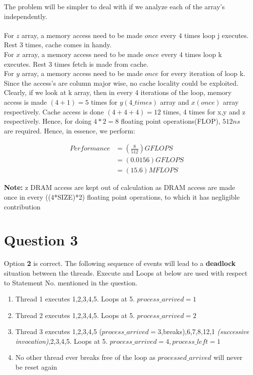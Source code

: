 \documentclass{article}
\newcommand{\bld}[1]{\textbf{#1}}
\newcommand{\ital}[1]{\textit{#1}}
\begin{document}
The problem will be simpler to deal with if we analyze each of the array's independently.\\\\
For $z$ array, a memory access need to be made $once$ every $4$ times loop j executes. Rest 3 times, cache comes in handy.\\
For $x$ array, a memory access need to be made $once$ every $4$ times loop k executes. Rest 3 times fetch is made from cache.\\
For $y$ array, a memory access need to be made $once$ for every iteration of loop k. Since the access's are column major wise, no cache locality could be exploited.\\

Clearly, if we look at k array, then in every 4 iterations of the loop, memory access is made $(4+1)=5$ times for $y(4\_times)$ array and $x(once)$ array respectively. Cache access is done $(4+4+4)=12$ times, 4 times for x,y and z respectively. Hence, for doing $4*2=8$ floating point operations(FLOP), $512 ns$ are required. Hence, in essence, we perform:

\begin{align*}
Performance &=(\frac{8}{512})GFLOPS\\
            &=(0.0156)GFLOPS\\
            &=(15.6)MFLOPS
\end{align*}

\bld{Note:} z DRAM access are kept out of calculation as DRAM access are made once in every ((4*SIZE)*2) floating point operations, to which it has negligible contribution

\section*{Question 3}
Option \bld{2} is correct. The following sequence of events will lead to a \bld{deadlock} situation between the threads. Execute and Loops at below are used with respect to Statement No. mentioned in the question.

\begin{enumerate}

  \item Thread 1 executes 1,2,3,4,5. Loops at 5. $process\_arrived=1$
  \item Thread 2 executes 1,2,3,4,5. Loops at 5. $process\_arrived=2$
  \item Thread 3 executes 1,2,3,4,5 ($process\_arrived=3$,breaks),6,7,8,12,1 \ital{(successive invocation)},2,3,4,5. Loops at 5. $process\_arrived=4, process\_left=1$
  \item No other thread ever breaks free of the loop as $processed\_arrived$ will never be reset again
\end{enumerate}
  
\end{document}

